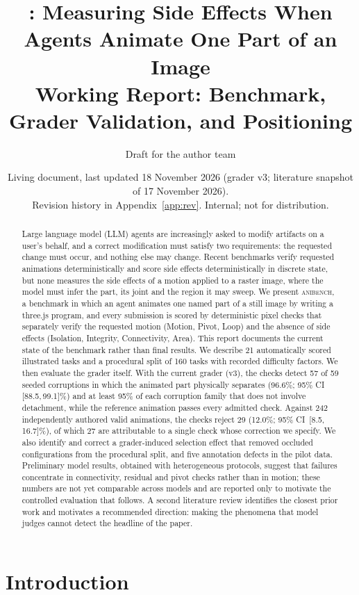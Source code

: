 \documentclass[11pt]{article}
\title{\anibench: Measuring Side Effects When Agents Animate One Part of an Image\\[4pt]
\large Working Report: Benchmark, Grader Validation, and Positioning}
\author{Draft for the author team}
\date{Living document, last updated 18 November 2026 (grader v3; literature snapshot of 17 November 2026).\\ Revision history in Appendix~\ref{app:rev}. Internal; not for distribution.}
\newcommand{\anibench}{\textsc{anibench}}
\newcommand{\ci}[2]{\,[#1,\,#2]}
\begin{document}
\maketitle

\begin{abstract}
Large language model (LLM) agents are increasingly asked to modify artifacts on a user's behalf, and a correct modification must satisfy two requirements: the requested change must occur, and nothing else may change. Recent benchmarks verify requested animations deterministically and score side effects deterministically in discrete state, but none measures the side effects of a motion applied to a raster image, where the model must infer the part, its joint and the region it may sweep. We present \anibench{}, a benchmark in which an agent animates one named part of a still image by writing a three.js program, and every submission is scored by deterministic pixel checks that separately verify the requested motion (Motion, Pivot, Loop) and the absence of side effects (Isolation, Integrity, Connectivity, Area). This report documents the current state of the benchmark rather than final results. We describe 21 automatically scored illustrated tasks and a procedural split of 160 tasks with recorded difficulty factors. We then evaluate the grader itself. With the current grader (v3), the checks detect 57 of 59 seeded corruptions in which the animated part physically separates (96.6\%; 95\% CI \ci{88.5}{99.1}\%) and at least 95\% of each corruption family that does not involve detachment, while the reference animation passes every admitted check. Against 242 independently authored valid animations, the checks reject 29 (12.0\%; 95\% CI \ci{8.5}{16.7}\%), of which 27 are attributable to a single check whose correction we specify. We also identify and correct a grader-induced selection effect that removed occluded configurations from the procedural split, and five annotation defects in the pilot data. Preliminary model results, obtained with heterogeneous protocols, suggest that failures concentrate in connectivity, residual and pivot checks rather than in motion; these numbers are not yet comparable across models and are reported only to motivate the controlled evaluation that follows. A second literature review identifies the closest prior work and motivates a recommended direction: making the phenomena that model judges cannot detect the headline of the paper.
\end{abstract}

\section{Introduction}
\end{document}
